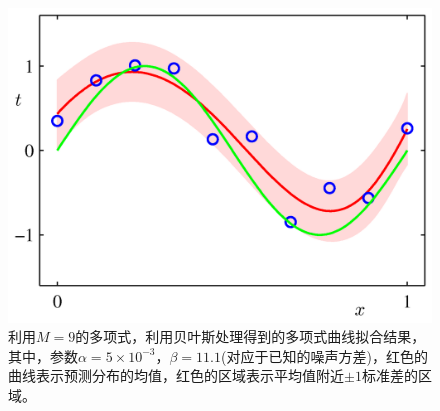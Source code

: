 \documentclass[b5paper]{book}
\numberwithin{equation}{chapter}
\begin{document}
{	\begin{figure}[H]
		\centering
		\includegraphics[scale=0.8]{Images/1-17.png}
		\caption{利用$M=9$的多项式，利用贝叶斯处理得到的多项式曲线拟合结果，其中，参数$\alpha = 5 \times 10^{-3}$，$\beta = 11.1$(对应于已知的噪声方差)，红色的曲线表示预测分布的均值，红色的区域表示平均值附近$\pm1$标准差的区域。}
		\label{fig:1-17}
	\end{figure}
	}
\end{document}
